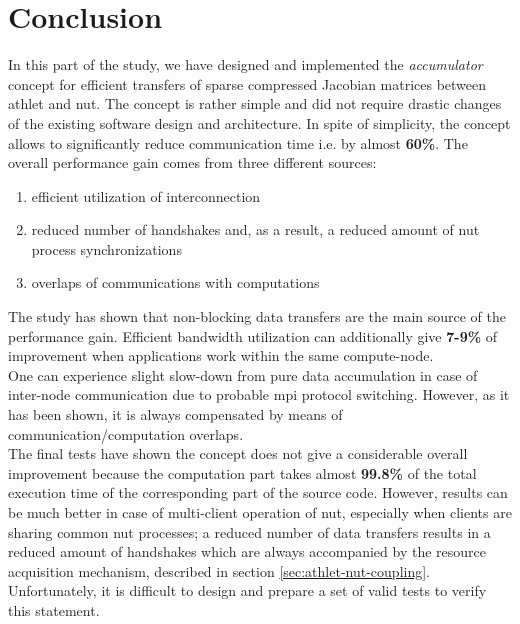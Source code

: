 \section{Conclusion}
\label{sec:accumulator-conclusions}


In this part of the study, we have designed and implemented the \textit{accumulator} concept for efficient transfers of sparse compressed Jacobian matrices between \acrshort{athlet} and \acrshort{nut}. The concept is rather simple and did not require drastic changes of the existing software design and architecture. In spite of simplicity, the concept allows to significantly reduce communication time i.e. by almost \textbf{60\%}. The overall performance gain comes from three different sources: 

\begin{enumerate}
	\item efficient utilization of interconnection
	\item reduced number of handshakes and, as a result, a reduced amount of \acrshort{nut} process synchronizations
	\item overlaps of communications with computations
\end{enumerate}

The study has shown that non-blocking data transfers are the main source of the performance gain. Efficient bandwidth utilization can additionally give \textbf{7-9\%} of improvement when applications work within the same compute-node.\\


One can experience slight slow-down from pure data accumulation in case of inter-node communication due to probable \acrshort{mpi} protocol switching. However, as it has been shown, it is always compensated by means of communication/computation overlaps.\\


The final tests have shown the concept does not give a considerable overall improvement because the computation part takes almost \textbf{99.8\%} of the total execution time of the corresponding part of the source code. However, results can be much better in case of multi-client operation of \acrshort{nut}, especially when clients are sharing common \acrshort{nut} processes; a reduced number of data transfers results in a reduced amount of handshakes which are always accompanied by the resource acquisition mechanism, described in section \ref{sec:athlet-nut-coupling}. Unfortunately, it is difficult to design and prepare a set of valid tests to verify this statement. \\


